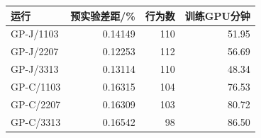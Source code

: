 \begin{tabular}{@{}lrrr@{}}
\toprule
运行 & 预实验差距/\% & 行为数 & 训练GPU分钟 \\ \midrule
GP-J/1103 & 0.14149 & 110 & 51.95 \\
GP-J/2207 & 0.12253 & 112 & 56.69 \\
GP-J/3313 & 0.13114 & 110 & 48.34 \\
GP-C/1103 & 0.16315 & 104 & 76.53 \\
GP-C/2207 & 0.16309 & 103 & 80.72 \\
GP-C/3313 & 0.16542 & 98 & 86.50 \\
\bottomrule
\end{tabular}

